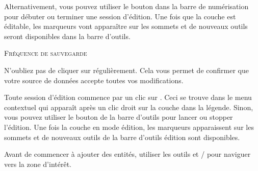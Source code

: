 Alternativement, vous pouvez utiliser le bouton  dans la 
barre de numérisation pour débuter ou terminer une session d'édition.
 Une fois que la couche est éditable, les marqueurs vont 
apparaître sur les sommets et de nouveaux outils seront disponibles dans la 
barre d'outils.

\begin{Tip}[ht]\caption{\textsc{Fréquence de sauvegarde}}
N'oubliez pas de cliquer sur  
régulièrement. Cela vous permet de confirmer que votre source de données accepte 
toutes vos modifications.
\end{Tip}

Toute session d'édition commence par un clic sur 
. Ceci se trouve 
dans le menu contextuel qui apparaît après un clic droit sur la couche dans la 
légende. Sinon, vous pouvez utiliser le bouton 
  de la barre d'outils pour lancer ou stopper l'édition. 
 Une fois la couche en mode édition, les marqueurs 
apparaissent sur les sommets et de nouveaux outils de la barre d'outils édition 
sont disponibles.

 

Avant de commencer à ajouter des entités, utiliser les outils  et / pour naviguer vers la zone d'intérêt.

